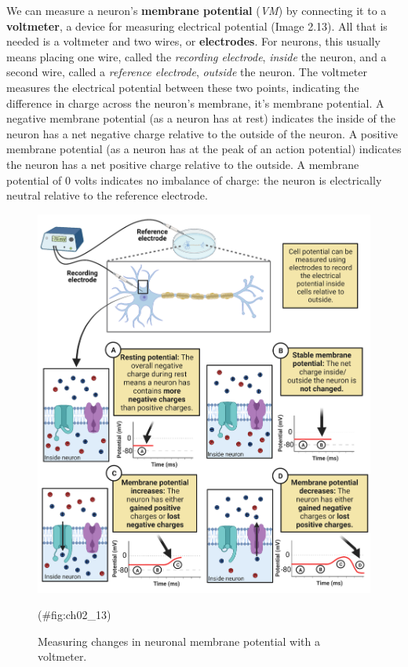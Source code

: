 \documentclass[
]{book}
\begin{document}
We can measure a neuron's \textbf{membrane potential }(\emph{VM}) by connecting it to a \textbf{voltmeter}, a device for measuring electrical potential (Image 2.13). All that is needed is a voltmeter and two wires, or \textbf{electrodes}. For neurons, this usually means placing one wire, called the \emph{recording electrode}, \emph{inside} the neuron, and a second wire, called a \emph{reference electrode}, \emph{outside} the neuron. The voltmeter measures the electrical potential between these two points, indicating the difference in charge across the neuron's membrane, it's membrane potential. A negative membrane potential (as a neuron has at rest) indicates the inside of the neuron has a net negative charge relative to the outside of the neuron. A positive membrane potential (as a neuron has at the peak of an action potential) indicates the neuron has a net positive charge relative to the outside. A membrane potential of 0 volts indicates no imbalance of charge: the neuron is electrically neutral relative to the reference electrode.

\begin{figure}

{\centering \includegraphics[width=0.8\linewidth]{images/ch02/02_13} 

}

\caption{Measuring changes in neuronal membrane potential with a voltmeter.}(\#fig:ch02_13)
\end{figure}
\end{document}
